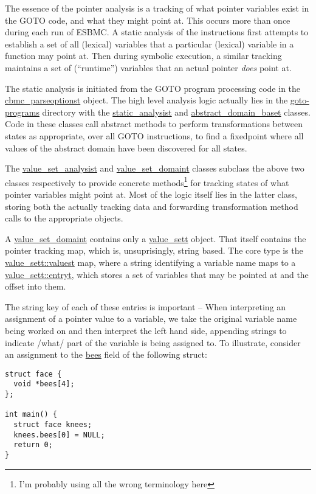 \documentclass{article}
\begin{document}
The essence of the pointer analysis is a tracking of what pointer variables
exist in the GOTO code, and what they might point at. This occurs more than once
during each run of ESBMC. A static analysis of the instructions first attempts
to establish a set of all (lexical) variables that a particular (lexical)
variable in a function may point at. Then during symbolic execution, a similar
tracking maintains a set of (``runtime'') variables that an actual pointer
\textit{does} point at.

The static analysis is initiated from the GOTO program processing code in the
\url{cbmc_parseoptionst} object. The high level analysis logic actually
lies in the \url{goto-programs} directory with the
\url{static_analysist} and \url{abstract_domain_baset}
classes. Code in these classes call abstract methods to perform transformations 
between states as appropriate, over all GOTO instructions, to find a fixedpoint
where all values of the abstract domain have been discovered for all states.

The \url{value_set_analysist} and \url{value_set_domaint} classes
subclass the above two classes respectively to provide concrete
methods\footnote{I'm probably using all the wrong terminology here} for
tracking states of what pointer variables might point at. Most of the logic
itself lies in the latter class, storing both the actually tracking data
and forwarding transformation method calls to the appropriate objects.

A \url{value_set_domaint} contains only a \url{value_sett} object.
That itself contains the pointer tracking map, which is, unsuprisingly,
string based. The core type is the \url{value_sett::valuest} map,
where a string identifying a variable name maps to a
\url{value_sett::entryt}, which stores a set of variables that may be
pointed at and the offset into them.

The string key of each of these entries is important -- When interpreting 
an assignment of a pointer value to a variable, we take the original variable
name being worked on and then interpret the left hand side, appending strings
to indicate /what/ part of the variable is being assigned to. To illustrate,
consider an assignment to the \url{bees} field of the following struct:
\begin{lstlisting}
struct face {
  void *bees[4];
};

int main() {
  struct face knees;
  knees.bees[0] = NULL;
  return 0;
}
\end{lstlisting}
\end{document}
